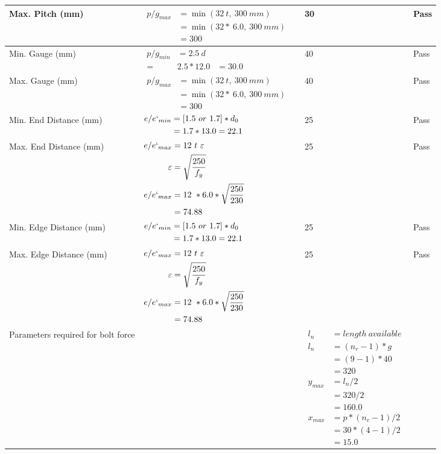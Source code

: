 \documentclass{article}%
\begin{document}
\begin{longtable}{|p{4cm}|p{5cm}|p{6.5cm}|p{1.5cm}|}
Max. Pitch (mm)&$\begin{aligned}p/g_{max} &=\min(32~t,~300~mm)&\\ &=\min(32 *~6.0,~ 300 ~mm)\\&=300\end{aligned}$&30&Pass\\%
\hline%
Min. Gauge (mm)&$\begin{aligned}p/g_{min}&= 2.5 ~ d&\\ =&2.5*12.0&=30.0\end{aligned}$&40&Pass\\%
\hline%
Max. Gauge (mm)&$\begin{aligned}p/g_{max} &=\min(32~t,~300~mm)&\\ &=\min(32 *~6.0,~ 300 ~mm)\\&=300\end{aligned}$&40&Pass\\%
\hline%
Min. End Distance (mm)&$\begin{aligned}e/e`_{min} &=[1.5~or~ 1.7] * d_0\\ &=1.7*13.0=22.1 \end{aligned}$&25&Pass\\%
\hline%
Max. End Distance (mm)&$\begin{aligned}e/e`_{max} &= 12~ t~ \varepsilon&\\ \varepsilon &= \sqrt{\frac{250}{f_y}}\\ e/e`_{max}&=12 ~*6.0*\sqrt{\frac{250}{230}}\\ &=74.88\\ \end{aligned}$&25&Pass\\%
\hline%
Min. Edge Distance (mm)&$\begin{aligned}e/e`_{min} &=[1.5~or~ 1.7] * d_0\\ &=1.7*13.0=22.1 \end{aligned}$&25&Pass\\%
\hline%
Max. Edge Distance (mm)&$\begin{aligned}e/e`_{max} &= 12~ t~ \varepsilon&\\ \varepsilon &= \sqrt{\frac{250}{f_y}}\\ e/e`_{max}&=12 ~*6.0*\sqrt{\frac{250}{230}}\\ &=74.88\\ \end{aligned}$&25&Pass\\%
\hline%
Parameters required for bolt force&&$\begin{aligned} l_n~~~ &= length~available \\  l_n~~~ &= (n_r - 1) * g\\  &= (9 - 1) *40\\  & =320\\  y_{max} &= l_n / 2\\  &= 320 / 2 \\  & =160.0\\ x_{max} &= p * (n_c - 1) / 2 \\  &= 30 * (4- 1) / 2 \\  & =15.0\end{aligned}$&\\%

\end{longtable}
\end{document}
